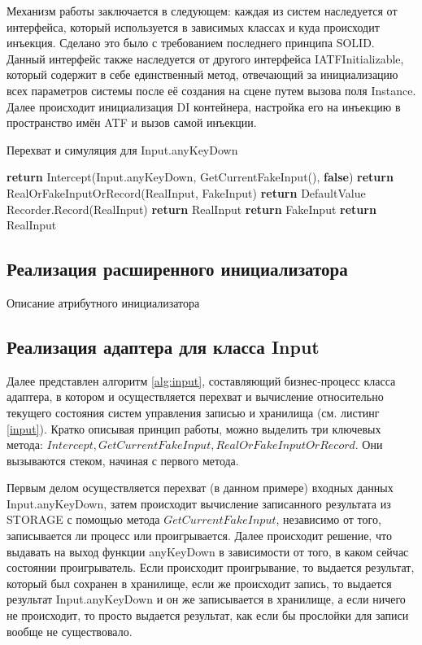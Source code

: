 Механизм работы заключается в следующем: каждая из систем наследуется от интерфейса, который используется в зависимых классах и куда происходит инъекция. Сделано это было с требованием последнего принципа SOLID. Данный интерфейс также наследуется от другого интерфейса IATFInitializable, который содержит в себе единственный метод, отвечающий за инициализацию всех параметров системы после её создания на сцене путем вызова поля Instance. Далее происходит инициализация DI контейнера, настройка его на инъекцию в пространство имён ATF и вызов самой инъекции.

\begin{algorithm}
	\caption{Перехват и симуляция для Input.anyKeyDown}\label{alg:input}
	\begin{algorithmic}
		\State \textbf{return} Intercept(Input.anyKeyDown, 
		\State GetCurrentFakeInput(), 
		\State \textbf{false})
		\EndProcedure
		\State \textbf{return} RealOrFakeInputOrRecord(RealInput, FakeInput)
		\Else
		\State \textbf{return} DefaultValue
		\EndIf
		\EndProcedure
		\State Recorder.Record(RealInput)
		\State \textbf{return} RealInput
		\State \textbf{return} FakeInput
		\Else
		\State \textbf{return} RealInput
		\EndIf
		\EndProcedure
	\end{algorithmic}
\end{algorithm}

\subsection{Реализация расширенного инициализатора}
Описание атрибутного инициализатора

\subsection{Реализация адаптера для класса Input}
Далее представлен алгоритм \ref{alg:input}, составляющий бизнес-процесс класса адаптера, в котором и осуществляется перехват и вычисление относительно текущего состояния систем управления записью и хранилища (см. листинг \ref{input}). Кратко описывая принцип работы, можно выделить три ключевых метода: $Intercept, GetCurrentFakeInput, RealOrFakeInputOrRecord$. Они вызываются стеком, начиная с первого метода. 

Первым делом осуществляется перехват (в данном примере) входных данных Input.anyKeyDown, затем происходит вычисление записанного результата из STORAGE с помощью метода $GetCurrentFakeInput$, независимо от того, записывается ли процесс или проигрывается. Далее происходит решение, что выдавать на выход функции anyKeyDown в зависимости от того, в каком сейчас состоянии проигрыватель. Если происходит проигрывание, то выдается результат, который был сохранен в хранилище, если же происходит запись, то выдается результат Input.anyKeyDown и он же записывается в хранилище, а если ничего не происходит, то просто выдается результат, как если бы прослойки для записи вообще не существовало.

